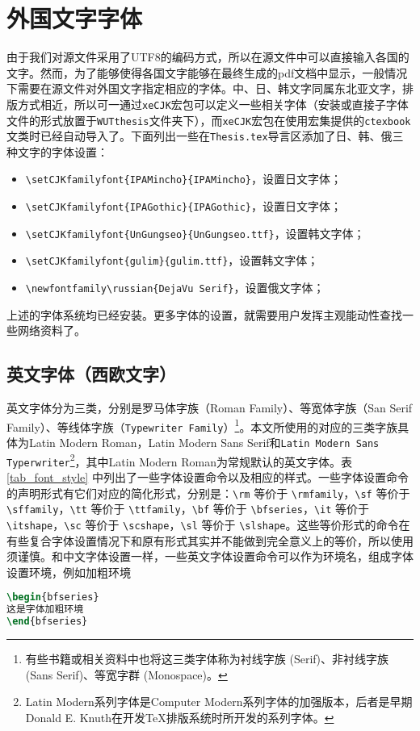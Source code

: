 \section{外国文字字体}

\par 由于我们对源文件采用了UTF8的编码方式，所以在源文件中可以直接输入各国的文字。然而，为了能够使得各国文字能够在最终生成的pdf文档中显示，一般情况下需要在源文件对外国文字指定相应的字体。中、日、韩文字同属东北亚文字，排版方式相近，所以可一通过\texttt{xeCJK}宏包可以定义一些相关字体（安装或直接子字体文件的形式放置于\texttt{WUTthesis}文件夹下），而\texttt{xeCJK}宏包在使用{\CTeX}宏集提供的\texttt{ctexbook}文类时已经自动导入了。下面列出一些在\texttt{Thesis.tex}导言区添加了日、韩、俄三种文字的字体设置：
\begin{itemize}
\item \verb"\setCJKfamilyfont{IPAMincho}{IPAMincho}"，设置日文字体；
\item \verb"\setCJKfamilyfont{IPAGothic}{IPAGothic}"，设置日文字体；
\item \verb"\setCJKfamilyfont{UnGungseo}{UnGungseo.ttf}"，设置韩文字体；
\item \verb"\setCJKfamilyfont{gulim}{gulim.ttf}"，设置韩文字体；
\item \verb"\newfontfamily\russian{DejaVu Serif}"，设置俄文字体；
\end{itemize}
上述的字体系统均已经安装。更多字体的设置，就需要用户发挥主观能动性查找一些网络资料了。


\subsection{英文字体（西欧文字）}
\par 英文字体分为三类，分别是罗马体字族（\textrm{Roman Family}）、等宽体字族（\textsf{San Serif Family}）、等线体字族（\texttt{Typewriter Family}）\footnote{有些书籍或相关资料中也将这三类字体称为衬线字族 (Serif)、非衬线字族 (Sans Serif)、等宽字群 (Monospace)。}。本文所使用的对应的三类字族具体为Latin Modern Roman，\textsf{Latin Modern Sans Serif}和\texttt{Latin Modern Sans Typerwriter}\footnote{Latin Modern系列字体是Computer Modern系列字体的加强版本，后者是早期Donald E. Knuth在开发{\TeX}排版系统时所开发的系列字体。}，其中Latin Modern Roman为常规默认的英文字体。表 \ref{tab_font_style} 中列出了一些字体设置命令以及相应的样式。一些字体设置命令的声明形式有它们对应的简化形式，分别是：\verb"\rm" 等价于 \verb"\rmfamily"，\verb"\sf" 等价于 \verb"\sffamily"，\verb"\tt" 等价于 \verb"\ttfamily"，\verb"\bf" 等价于 \verb"\bfseries"，\verb"\it" 等价于 \verb"\itshape"，\verb"\sc" 等价于 \verb"\scshape"，\verb"\sl" 等价于 \verb"\slshape"。这些等价形式的命令在有些复合字体设置情况下和原有形式其实并不能做到完全意义上的等价，所以使用须谨慎。和中文字体设置一样，一些英文字体设置命令可以作为环境名，组成字体设置环境，例如加粗环境
\begin{lstlisting}[language=TeX]
\begin{bfseries}
这是字体加粗环境
\end{bfseries}
\end{lstlisting}




